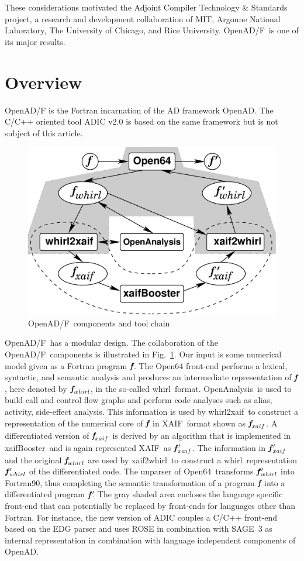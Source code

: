 \documentclass{book}
\newcommand{\OpenADF}{OpenAD/F}
\newcommand{\OpenAD}{OpenAD}
\newcommand{\OpenAnalysis}{OpenAnalysis}
\newcommand{\OpenSixtyFour}{Open64}
\newcommand{\xaif}{XAIF}
\newcommand{\xaifBooster}{xaifBooster}
\newcommand{\whirl}{whirl}
\newcommand{\whirlToxaif}{whirl2xaif}
\newcommand{\xaifTowhirl}{xaif2whirl}
\newcommand{\bmf}{\mbox{\bf\em f}}
\newcommand{\bmfp}{\mbox{\bf\em f$\,^\prime\!\!$}}
\newcommand{\reffig}[1]{{Fig.~\ref{#1}}}
\begin{document}
These considerations motivated the 
Adjoint Compiler Technology \& Standards \cite{actsWeb} project, a research and 
development collaboration of MIT, Argonne National Laboratory, 
The University of Chicago, and Rice University. \OpenADF\ is one of its major results.

\section{Overview} \label{sec:overview}
\OpenADF \cite{openadWeb}
is the Fortran incarnation of the AD framework \OpenAD.
The C/C++ oriented tool ADIC v2.0 \cite{adicWeb}
is based on the same framework but is 
not subject of this article.
\begin{figure}
  \centering\includegraphics[width=.5\textwidth]{overview}
  \caption{\OpenADF\ components and tool chain} \label{fig:overview}
\end{figure}
\OpenADF\ has  a modular design. 
The collaboration  of the \OpenADF\ components is illustrated in 
\reffig{fig:overview}.
Our input is some numerical model given as a Fortran program 
$\bmf$.
The \OpenSixtyFour\cite{open64Web}
front-end performs a lexical, 
syntactic, and semantic analysis and produces an 
intermediate representation of $\bmf$, here denoted by $\bmf_{\whirl}$, 
in the so-called \whirl\ format.
\OpenAnalysis\ is used to build call and control flow graphs and  perform 
code analyses such as alias, activity, side-effect analysis.
This information is used by 
\whirlToxaif\ to construct a representation of the numerical core of $\bmf$ in
\xaif\ format shown as $\bmf_{xaif}$.  
A differentiated version of $\bmf_{xaif}$ is derived by an 
algorithm that is implemented in \xaifBooster\ and is again represented 
\xaif\ as $\bmfp_{xaif}$.
The information in $\bmfp_{xaif}$ and the original $\bmf_{\whirl}$ are used by 
\xaifTowhirl\ to construct a 
\whirl\ representation $\bmfp_{\whirl}$ of the differentiated code. 
The unparser of 
\OpenSixtyFour\ transforms $\bmfp_{\whirl}$ into Fortran90, thus completing
the semantic transformation of a program $\bmf$ into
a differentiated program $\bmfp$.
The gray shaded area encloses the language specific front-end that can potentially
be replaced by front-ends for languages other than Fortran. 
For instance, the new version of ADIC \cite{HoNo01} couples a C/C++ 
front-end 
based on the EDG parser \cite{edgWeb} and uses ROSE in combination with SAGE~3 \cite{roseWeb} 
as internal representation in combination with language independent components of \OpenAD.
\end{document}
